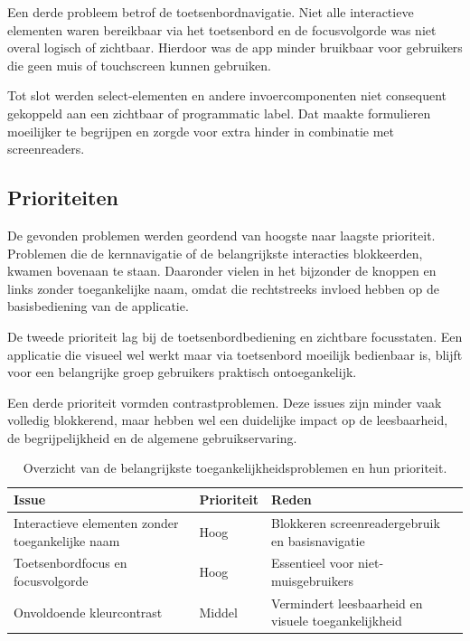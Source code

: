 Een derde probleem betrof de toetsenbordnavigatie. Niet alle interactieve elementen waren bereikbaar via het toetsenbord en de focusvolgorde was niet overal logisch of zichtbaar. Hierdoor was de app minder bruikbaar voor gebruikers die geen muis of touchscreen kunnen gebruiken.

Tot slot werden select-elementen en andere invoercomponenten niet consequent gekoppeld aan een zichtbaar of programmatic label. Dat maakte formulieren moeilijker te begrijpen en zorgde voor extra hinder in combinatie met screenreaders.

\subsection{Prioriteiten}
\label{subsec:prioriteiten}

De gevonden problemen werden geordend van hoogste naar laagste prioriteit. Problemen die de kernnavigatie of de belangrijkste interacties blokkeerden, kwamen bovenaan te staan. Daaronder vielen in het bijzonder de knoppen en links zonder toegankelijke naam, omdat die rechtstreeks invloed hebben op de basisbediening van de applicatie.

De tweede prioriteit lag bij de toetsenbordbediening en zichtbare focusstaten. Een applicatie die visueel wel werkt maar via toetsenbord moeilijk bedienbaar is, blijft voor een belangrijke groep gebruikers praktisch ontoegankelijk.

Een derde prioriteit vormden contrastproblemen. Deze issues zijn minder vaak volledig blokkerend, maar hebben wel een duidelijke impact op de leesbaarheid, de begrijpelijkheid en de algemene gebruikservaring.

\begin{table}[h]
\centering
\caption[Prioritering van toegankelijkheidsproblemen]{Overzicht van de belangrijkste toegankelijkheidsproblemen en hun prioriteit.}
\label{tab:prioritering-issues}
\begin{tabular}{p{}p{}p{}}
\hline
\textbf{Issue} & \textbf{Prioriteit} & \textbf{Reden} \\
\hline
Interactieve elementen zonder toegankelijke naam & Hoog & Blokkeren screenreadergebruik en basisnavigatie \\
Toetsenbordfocus en focusvolgorde & Hoog & Essentieel voor niet-muisgebruikers \\
Onvoldoende kleurcontrast & Middel & Vermindert leesbaarheid en visuele toegankelijkheid \\
\hline
\end{tabular}
\end{table}

